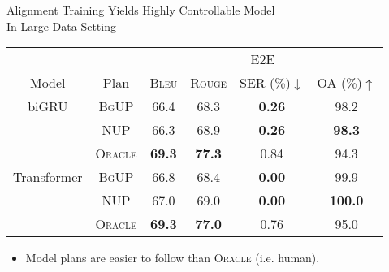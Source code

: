 \begin{frame}{Alignment Training Yields Highly Controllable Model\\
        In Large Data Setting}

        \begin{tabular}{cccccc}
            \toprule
            & & \multicolumn{4}{c}{E2E} \\
            \cmidrule(lr){3-6} 
          Model & Plan & \textsc{Bleu} & \textsc{Rouge} & SER (\%)$\downarrow$ & OA (\%)$\uparrow$ \\
            \midrule
    biGRU & \textsc{BgUP} & 66.4 & 68.3 & \textbf{0.26} & 98.2 \\
          & \textsc{NUP} & 66.3 & 68.9 & \textbf{0.26} & \textbf{98.3} \\
          & \textsc{Oracle} & \textbf{69.3} & \textbf{77.3} & 0.84 & 94.3 \\
            \midrule
            {\footnotesize Transformer} & \textsc{BgUP} & 66.8 & 68.4 & \textbf{0.00} & 99.9 \\
          & \textsc{NUP} & 67.0 & 69.0 & \textbf{0.00} & \textbf{100.0} \\
          & \textsc{Oracle} & \textbf{69.3} & \textbf{77.0} & 0.76 & 95.0 \\
            \bottomrule
        \end{tabular}
        \begin{itemize}
            \item Model plans are easier to follow than \textsc{Oracle} (i.e. human).
        \end{itemize}
\end{frame}

